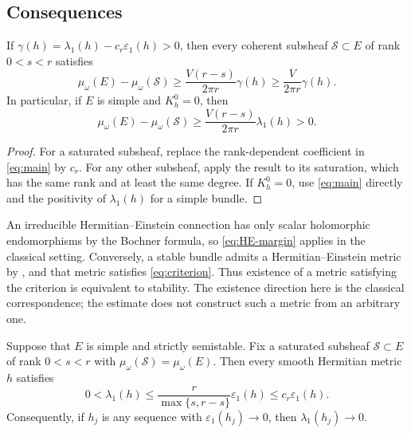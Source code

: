 \subsection{Consequences}

\begin{corollary}\label{cor:margin}
If $\gamma(h)=\lambda_1(h)-c_r\varepsilon_1(h)>0$, then every coherent
subsheaf $\mathcal S\subset E$ of rank $0<s<r$ satisfies
\[
 \mu_\omega(E)-\mu_\omega(\mathcal S)
 \ge\frac{V(r-s)}{2\pi r}\gamma(h)
 \ge\frac{V}{2\pi r}\gamma(h).
\]
In particular, if $E$ is simple and $K_h^0=0$, then
\begin{equation}\label{eq:HE-margin}
 \mu_\omega(E)-\mu_\omega(\mathcal S)
 \ge\frac{V(r-s)}{2\pi r}\lambda_1(h)>0.
\end{equation}
\end{corollary}

\begin{proof}
For a saturated subsheaf, replace the rank-dependent coefficient in
\eqref{eq:main} by $c_r$. For any other subsheaf, apply the result to its
saturation, which has the same rank and at least the same degree. If
$K_h^0=0$, use \eqref{eq:main} directly and the positivity of
$\lambda_1(h)$ for a simple bundle.
\end{proof}

\begin{remark}
An irreducible Hermitian--Einstein connection has only scalar
holomorphic endomorphisms by the Bochner formula, so
\eqref{eq:HE-margin} applies in the classical setting. Conversely, a
stable bundle admits a Hermitian--Einstein metric by
\cite{Donaldson1985,UhlenbeckYau1986}, and that metric satisfies
\eqref{eq:criterion}. Thus existence of a metric satisfying the
criterion is equivalent to stability. The existence direction here is
the classical correspondence; the estimate does not construct such a
metric from an arbitrary one.
\end{remark}

\begin{corollary}\label{cor:collapse}
Suppose that $E$ is simple and strictly semistable. Fix a saturated
subsheaf $\mathcal S\subset E$ of rank $0<s<r$ with
$\mu_\omega(\mathcal S)=\mu_\omega(E)$. Then every smooth Hermitian
metric $h$ satisfies
\begin{equation}\label{eq:collapse}
 0<\lambda_1(h)
 \le\frac{r}{\max\{s,r-s\}}\varepsilon_1(h)
 \le c_r\varepsilon_1(h).
\end{equation}
Consequently, if $h_j$ is any sequence with
$\varepsilon_1(h_j)\longrightarrow0$, then
$\lambda_1(h_j)\longrightarrow0$.
\end{corollary}

